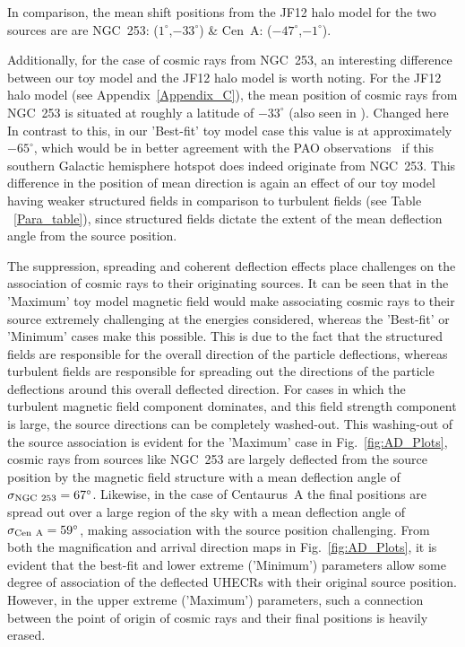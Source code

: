 \documentclass[usenatbib]{mnras}
\newcommand{\Vasu}[1]{{\color{purple}#1}}
\begin{document}
In comparison, the mean shift positions from the JF12 halo model for the two sources are are  NGC~253: ($1^{\circ}$,$-33^{\circ}$) \& Cen~A: ($-47^{\circ}$,$-1^{\circ}$).

Additionally, for the case of cosmic rays from NGC~253, an interesting difference between our toy model and the JF12 halo model is worth noting. For the JF12 halo model (see Appendix~\ref{Appendix_C}), the mean position of cosmic rays from NGC~253 is situated at roughly a latitude of $-33^{\circ}$ (also seen in \citet{Arjen_2021}). \Vasu{Changed here} In contrast to this, in our 'Best-fit' toy model case this value is at approximately $-65^{\circ}$, which would be in better agreement with the PAO observations~\citep{Auger_Starburst2018} if this southern Galactic hemisphere hotspot does indeed originate from NGC~253. This difference in the position of mean direction is again an effect of our toy model having weaker structured fields in comparison to turbulent fields (see Table ~\ref{Para_table}), since structured fields dictate the extent of the mean deflection angle from the source position. 

The suppression, spreading and coherent deflection effects place challenges on the association of cosmic rays to their originating sources. It can be seen that in the 'Maximum' toy model magnetic field would make associating cosmic rays to their source extremely challenging at the energies considered, whereas the 'Best-fit' or 'Minimum' cases make this possible. This is due to the fact that the structured fields are responsible for the overall direction of the particle deflections, whereas turbulent fields are responsible for spreading out the directions of the particle deflections around this overall deflected direction. For cases in which the turbulent magnetic field component dominates, and this field strength component is large, the source directions can be completely washed-out. This washing-out of the source association is evident for the 'Maximum' case in Fig.~\ref{fig:AD_Plots}, cosmic rays from sources like NGC~253 are largely deflected from the source position by the magnetic field structure with a mean deflection angle of $\sigma_{\rm NGC~253} = 67^{\circ}$. Likewise, in the case of Centaurus~A the final positions are spread out over a large region of the sky with a mean deflection angle of $\sigma_{\rm Cen~A} = 59^{\circ}$, making association with the source position challenging. From both the magnification and arrival direction maps in Fig.~\ref{fig:AD_Plots}, it is evident that the best-fit and lower extreme ('Minimum') parameters allow some degree of association of the deflected UHECRs with their original source position. However, in the upper extreme ('Maximum') parameters, such a connection between the point of origin of cosmic rays and their final positions is heavily erased. 
\end{document}
